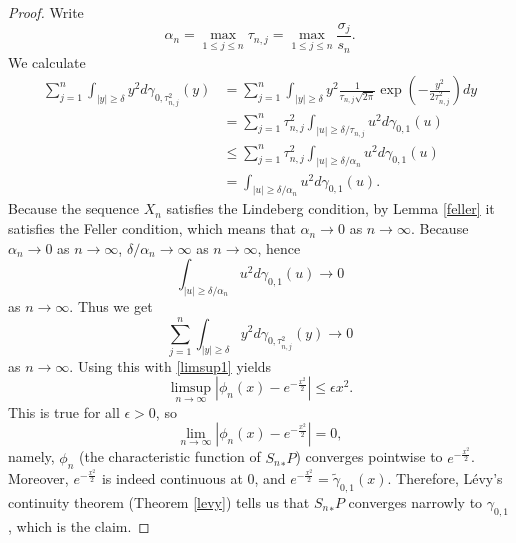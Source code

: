 \documentclass{article}
\theoremstyle{definition}
\theoremstyle{definition}
\begin{document}
\begin{proof}
Write
\[
\alpha_n = \max_{1 \leq j \leq n} \tau_{n,j} = \max_{1 \leq j \leq n} \frac{\sigma_j}{s_n}.
\]
We calculate
\begin{align*}
\sum_{j=1}^n \int_{|y| \geq \delta} y^2 d\gamma_{0,\tau_{n,j}^2}(y)&=\sum_{j=1}^n \int_{|y| \geq \delta}
y^2 \frac{1}{\tau_{n,j} \sqrt{2\pi}} \exp\left(-\frac{y^2}{2\tau_{n,j}^2} \right) dy\\
&=\sum_{j=1}^n  \tau_{n,j}^2 \int_{|u| \geq \delta/\tau_{n,j}}  u^2 d\gamma_{0,1}(u)\\
&\leq  \sum_{j=1}^n \tau_{n,j}^2 \int_{|u| \geq \delta/\alpha_n} u^2 d\gamma_{0,1}(u)\\
&=\int_{|u| \geq \delta/\alpha_n} u^2 d\gamma_{0,1}(u).
\end{align*}
Because the sequence $X_n$ satisfies the Lindeberg condition, by Lemma \ref{feller} it satisfies the Feller
condition, which means that $\alpha_n \to 0$ as $n \to \infty$. Because $\alpha_n \to 0$ as $n \to \infty$,
$\delta/\alpha_n \to \infty$ as $n \to \infty$, hence
\[
\int_{|u| \geq \delta/\alpha_n} u^2 d\gamma_{0,1}(u) \to 0
\]
as $n \to \infty$. Thus we get
\[
\sum_{j=1}^n \int_{|y| \geq \delta} y^2 d\gamma_{0,\tau_{n,j}^2}(y) \to 0
\]
as $n \to \infty$. Using this with \eqref{limsup1} yields
\[
\limsup_{n \to \infty} |\phi_n(x)-e^{-\frac{x^2}{2}}|  \leq \epsilon x^2.
\]
This is true for all $\epsilon>0$, so
\[
\lim_{n \to \infty}  |\phi_n(x)-e^{-\frac{x^2}{2}}|  = 0,
\]
namely, $\phi_n$ (the characteristic function of ${S_n}_*P$) converges pointwise to $e^{-\frac{x^2}{2}}$. Moreover, 
 $e^{-\frac{x^2}{2}}$ is indeed continuous at $0$, and
$e^{-\frac{x^2}{2}}=\tilde{\gamma}_{0,1}(x)$. Therefore, L\'evy's continuity theorem (Theorem \ref{levy})
tells us that ${S_n}_*P$ converges narrowly to $\gamma_{0,1}$, which is the claim.
\end{proof}
\end{document}
